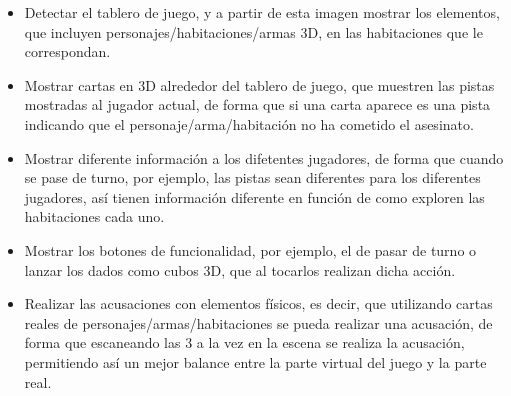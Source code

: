 \begin{itemize}
  \item Detectar el tablero de juego, y a partir de esta imagen mostrar los elementos, que incluyen personajes/habitaciones/armas 3D, en las habitaciones que le correspondan.
  \item Mostrar cartas en 3D alrededor del tablero de juego, que muestren las pistas mostradas al jugador actual, de forma que si una carta aparece es una pista indicando que el personaje/arma/habitación no ha cometido el asesinato.
  \item Mostrar diferente información a los difetentes jugadores, de forma que cuando se pase de turno, por ejemplo, las pistas sean diferentes para los diferentes jugadores, así tienen información diferente en función de como exploren las habitaciones cada uno.
  \item Mostrar los botones de funcionalidad, por ejemplo, el de pasar de turno o lanzar los dados como cubos 3D, que al tocarlos realizan dicha acción.
  \item Realizar las acusaciones con elementos físicos, es decir, que utilizando cartas reales de personajes/armas/habitaciones se pueda realizar una acusación, de forma que escaneando las 3 a la vez en la escena se realiza la acusación, permitiendo así un mejor balance entre la parte virtual del juego y la parte real.
\end{itemize}
